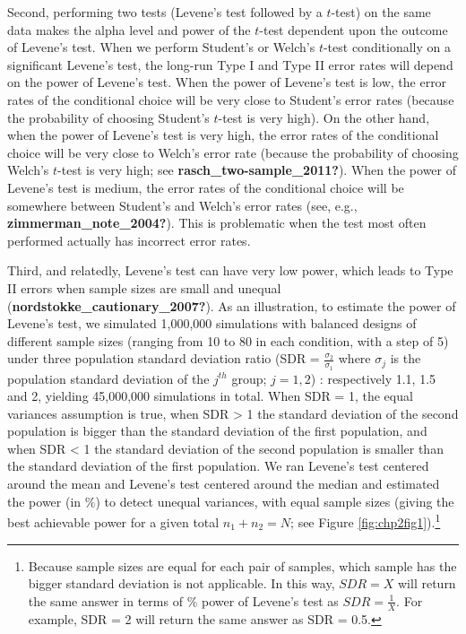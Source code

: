 \documentclass[
  english,
  man]{apa6}
\begin{document}
Second, performing two tests (Levene's test followed by a \(t\)-test) on the same data makes the alpha level and power of the \(t\)-test dependent upon the outcome of Levene's test. When we perform Student's or Welch's \(t\)-test conditionally on a significant Levene's test, the long-run Type I and Type II error rates will depend on the power of Levene's test. When the power of Levene's test is low, the error rates of the conditional choice will be very close to Student's error rates (because the probability of choosing Student's \(t\)-test is very high). On the other hand, when the power of Levene's test is very high, the error rates of the conditional choice will be very close to Welch's error rate (because the probability of choosing Welch's \(t\)-test is very high; see \textbf{rasch\_two-sample\_2011?}). When the power of Levene's test is medium, the error rates of the conditional choice will be somewhere between Student's and Welch's error rates (see, e.g., \textbf{zimmerman\_note\_2004?}). This is problematic when the test most often performed actually has incorrect error rates.

Third, and relatedly, Levene's test can have very low power, which leads to Type II errors when sample sizes are small and unequal (\textbf{nordstokke\_cautionary\_2007?}). As an illustration, to estimate the power of Levene's test, we simulated 1,000,000 simulations with balanced designs of different sample sizes (ranging from 10 to 80 in each condition, with a step of 5) under three population standard deviation ratio (SDR = \(\frac{\sigma_2}{\sigma_1}\) where \(\sigma_j\) is the population standard deviation of the \(j^{th}\) group; \(j=1,2\)) : respectively 1.1, 1.5 and 2, yielding 45,000,000 simulations in total. When SDR = 1, the equal variances assumption is true, when SDR \textgreater{} 1 the standard deviation of the second population is bigger than the standard deviation of the first population, and when SDR \textless{} 1 the standard deviation of the second population is smaller than the standard deviation of the first population. We ran Levene's test centered around the mean and Levene's test centered around the median and estimated the power (in \(\%\)) to detect unequal variances, with equal sample sizes (giving the best achievable power for a given total \(n_1+n_2=N\); see Figure \ref{fig:chp2fig1}).\footnote{Because sample sizes are equal for each pair of samples, which sample has the bigger standard deviation is not applicable. In this way, $SDR = X$ will return the same answer in terms of $\%$ power of Levene’s test as $SDR = \frac{1}{X}$. For example, SDR = 2 will return the same answer as SDR = 0.5.}
\end{document}
